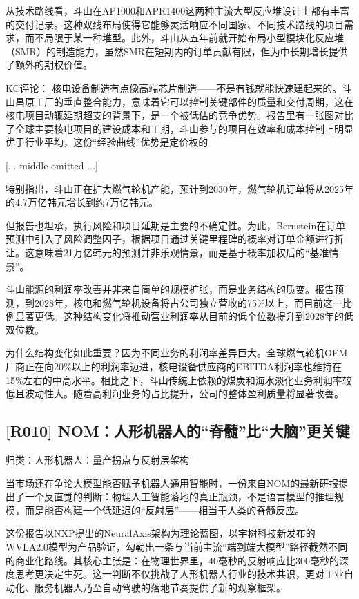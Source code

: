 \documentclass[11pt]{ctexart}
\begin{document}
从技术路线看，斗山在AP1000和APR1400这两种主流大型反应堆设计上都有丰富的交付记录。这种双线布局使得它能够灵活响应不同国家、不同技术路线的项目需求，而不局限于某一种堆型。此外，斗山从五年前就开始布局小型模块化反应堆（SMR）的制造能力，虽然SMR在短期内的订单贡献有限，但为中长期增长提供了额外的期权价值。

KC评论： 核电设备制造有点像高端芯片制造——不是有钱就能快速建起来的。斗山昌原工厂的垂直整合能力，意味着它可以控制关键部件的质量和交付周期，这在核电项目动辄延期超支的背景下，是一个被低估的竞争优势。报告里有一张图对比了全球主要核电项目的建设成本和工期，斗山参与的项目在效率和成本控制上明显优于行业平均，这份“经验曲线”优势是定价权的

[... middle omitted ...]

特别指出，斗山正在扩大燃气轮机产能，预计到2030年，燃气轮机订单将从2025年的4.7万亿韩元增长到约7万亿韩元。

但报告也坦承，执行风险和项目延期是主要的不确定性。为此，Bernstein在订单预测中引入了风险调整因子，根据项目通过关键里程碑的概率对订单金额进行折让。这意味着21万亿韩元的预测并非乐观情景，而是基于概率加权后的“基准情景”。

斗山能源的利润率改善并非来自简单的规模扩张，而是业务结构的质变。报告预测，到2028年，核电和燃气轮机设备将占公司独立营收的75\%以上，而目前这一比例显著更低。这种结构变化将推动营业利润率从目前的低个位数提升到2028年的低双位数。

为什么结构变化如此重要？因为不同业务的利润率差异巨大。全球燃气轮机OEM厂商正在向20\%以上的利润率迈进，核电设备供应商的EBITDA利润率也维持在15\%左右的中高水平。相比之下，斗山传统上依赖的煤炭和海水淡化业务利润率较低且波动性大。随着高利润业务的占比提升，公司的整体盈利质量将显著改善。

\subsection{[R010] NOM：人形机器人的“脊髓”比“大脑”更关键}
{\small\color{refgray}归类：人形机器人：量产拐点与反射层架构}

当市场还在争论大模型能否赋予机器人通用智能时，一份来自NOM的最新研报提出了一个反直觉的判断：物理人工智能落地的真正瓶颈，不是语言模型的推理规模，而是能否构建一个低延迟的“反射层”——相当于人类的脊髓反应。

这份报告以NXP提出的NeuralAxis架构为理论蓝图，以宇树科技新发布的WVLA2.0模型为产品验证，勾勒出一条与当前主流“端到端大模型”路径截然不同的商业化路线。其核心主张是：在物理世界里，40毫秒的反射响应比300毫秒的深度思考更决定生死。这一判断不仅挑战了人形机器人行业的技术共识，更对工业自动化、服务机器人乃至自动驾驶的落地节奏提供了新的观察框架。
\end{document}
